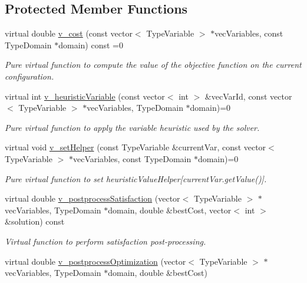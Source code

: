 \subsection*{Protected Member Functions}
\begin{DoxyCompactItemize}
\item 
virtual double \hyperlink{classghost_1_1Objective_affb6d6730adfbfe6a1f990e00d2a5eb2}{v\-\_\-cost} (const vector$<$ Type\-Variable $>$ $\ast$vec\-Variables, const Type\-Domain $\ast$domain) const =0
\begin{DoxyCompactList}\small\item\em Pure virtual function to compute the value of the objective function on the current configuration. \end{DoxyCompactList}\item 
virtual int \hyperlink{classghost_1_1Objective_ae4a49d23569c367182f934c25a6c6103}{v\-\_\-heuristic\-Variable} (const vector$<$ int $>$ \&vec\-Var\-Id, const vector$<$ Type\-Variable $>$ $\ast$vec\-Variables, Type\-Domain $\ast$domain)=0
\begin{DoxyCompactList}\small\item\em Pure virtual function to apply the variable heuristic used by the solver. \end{DoxyCompactList}\item 
virtual void \hyperlink{classghost_1_1Objective_a8c4efc1602123b28626a37c53e100a6e}{v\-\_\-set\-Helper} (const Type\-Variable \&current\-Var, const vector$<$ Type\-Variable $>$ $\ast$vec\-Variables, const Type\-Domain $\ast$domain)=0
\begin{DoxyCompactList}\small\item\em Pure virtual function to set heuristic\-Value\-Helper\mbox{[}current\-Var.\-get\-Value()\mbox{]}. \end{DoxyCompactList}\item 
virtual double \hyperlink{classghost_1_1Objective_a4951d988a677086366fd71fa4d7d3d0d}{v\-\_\-postprocess\-Satisfaction} (vector$<$ Type\-Variable $>$ $\ast$vec\-Variables, Type\-Domain $\ast$domain, double \&best\-Cost, vector$<$ int $>$ \&solution) const 
\begin{DoxyCompactList}\small\item\em Virtual function to perform satisfaction post-\/processing. \end{DoxyCompactList}\item 
virtual double \hyperlink{classghost_1_1Objective_a25c90555bec03d1d15f83ae145d81f8f}{v\-\_\-postprocess\-Optimization} (vector$<$ Type\-Variable $>$ $\ast$vec\-Variables, Type\-Domain $\ast$domain, double \&best\-Cost)

\end{DoxyCompactItemize}
